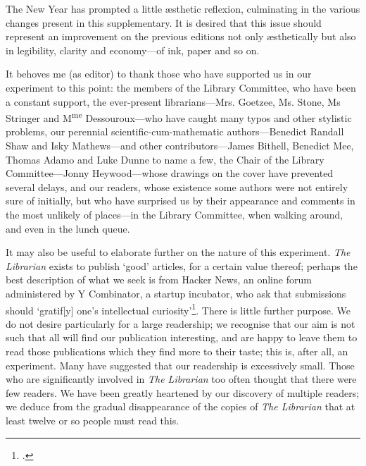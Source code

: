 The New Year has prompted a little æsthetic reflexion, culminating in the
various changes present in this supplementary. It is desired that this issue
should represent an improvement on the previous editions not only æsthetically
but also in legibility, clarity and economy---of ink, paper and so on.

It behoves me (as editor) to thank those who have supported us in our experiment
to this point: the members of the Library Committee, who have been a constant
support, the ever-present librarians---Mrs. Goetzee, Ms. Stone, Ms Stringer and
M\textsuperscript{me} Dessouroux---who have caught many typos and other stylistic problems, our
perennial scientific-cum-mathematic authors---Benedict Randall Shaw and Isky
Mathews---and other contributors---James Bithell, Benedict Mee, Thomas Adamo
and Luke Dunne to name a few, the Chair of the Library Committee---Jonny
Heywood---whose drawings on the cover have prevented several delays, and our
readers, whose existence some authors were not entirely sure of initially, but
who have surprised us by their appearance and comments in the most unlikely of
places---in the Library Committee, when walking around, and even in the lunch
queue.

It may also be useful to elaborate further on the nature of this experiment.
\textit{The Librarian} exists to publish `good' articles, for a certain value
thereof; perhaps the best description of what we seek is from Hacker News, an
online forum administered by Y Combinator, a startup incubator, who ask that
submissions should `gratif[y] one's intellectual curiosity'\footcite{hn}.
There is little further purpose. We do not desire particularly for a large
readership; we recognise that our aim is not such that all will find our
publication interesting, and are happy to leave them to read those publications
which they find more to their taste; this is, after all, an experiment.
Many have suggested that our readership is excessively small. Those who
are significantly involved in \textit{The Librarian} too often thought that
there were few readers. We have been greatly heartened by our discovery of
multiple readers; we deduce from the gradual disappearance of the copies of
\textit{The Librarian} that at least twelve or so people must read this.

